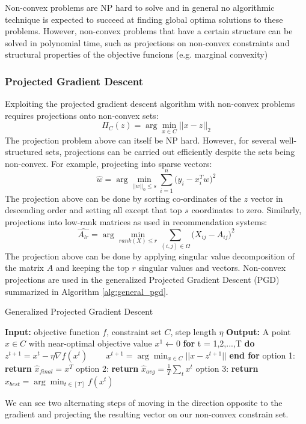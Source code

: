 Non-convex problems are NP hard to solve and in general no algorithmic technique is expected to succeed at finding global optima solutions to these problems. However, non-convex problems that have a certain structure can be solved in polynomial time, such as projections on non-convex constraints and structural properties of the objective funcions (e.g. marginal convexity) \cite{NonConvexML}

\subsubsection{Projected Gradient Descent}

Exploiting the projected gradient descent algorithm with non-convex problems requires projections onto non-convex sets:
\begin{equation}
    \Pi_{C}(z) = \arg \min_{x \in C} ||x-z||_2
\end{equation}
The projection problem above can itself be NP hard. However, for several well-structured sets, projections can be carried out efficiently despite the sets being non-convex. For example, projecting into sparse vectors:
\begin{equation}
    \hat{w} = \arg \min_{||w||_0 \leq s} \sum_{i=1}^{n}\big(y_i - x_{i}^{T}w \big)^{2}
\end{equation}
The projection above can be done by sorting co-ordinates of the $z$ vector in descending order and setting all except that top $s$ coordinates to zero. Similarly, projections into low-rank matrices as used in recommendation systems:
\begin{equation}
    \hat{A_{lr}} = \arg \min_{rank(X) \leq r}\sum_{(i,j)\in \Omega}\big(X_{ij} - A_{ij}\big)^{2}
\end{equation}
The projection above can be done by applying singular value decomposition of the matrix $A$ and keeping the top $r$ singular values and vectors. Non-convex projections are used in the generalized Projected Gradient Descent (PGD) summarized in Algorithm \ref{alg:general_pgd}.

\begin{algorithm}
\caption{Generalized Projected Gradient Descent}
\label{alg:general_pgd}
\begin{algorithmic}[1]
\STATE \textbf{Input:} objective function $f$, constraint set $C$, step length $\eta$
\STATE \textbf{Output:} A point $\hat{x} \in C$ with near-optimal objective value
\STATE $x^{1} \leftarrow 0$
\STATE \textbf{for} t = 1,2,...,T \textbf{do}
\STATE ~~~ $z^{t+1} = x^{t} - \eta \nabla f(x^{t})$
\STATE ~~~ $x^{t+1} = \arg \min_{x \in C}||x - z^{t+1}||$
\STATE \textbf{end for}
\STATE option 1: \textbf{return} $\hat{x}_{final} = x^{T}$
\STATE option 2: \textbf{return} $\hat{x}_{avg} = \frac{1}{T}\sum_t x^{t}$
\STATE option 3: \textbf{return} $\hat{x}_{best} = \arg \min_{t \in [T]} f(x^{t})$
\end{algorithmic}
\end{algorithm}
We can see two alternating steps of moving in the direction opposite to the gradient and projecting the resulting vector on our non-convex constrain set. 

